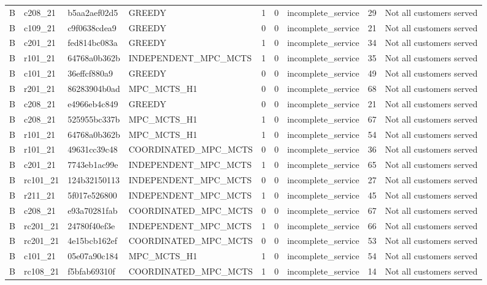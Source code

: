 \begin{table}
{\begin{tabular}{llllrrlrl}
B & c208\_21 & b5aa2aef02d5 & GREEDY & 1 & 0 & incomplete\_service & 29 & Not all customers served \\
B & c109\_21 & c9f0638cdea9 & GREEDY & 0 & 0 & incomplete\_service & 21 & Not all customers served \\
B & c201\_21 & fed814bc083a & GREEDY & 1 & 0 & incomplete\_service & 34 & Not all customers served \\
B & r101\_21 & 64768a0b362b & INDEPENDENT\_MPC\_MCTS & 1 & 0 & incomplete\_service & 35 & Not all customers served \\
B & c101\_21 & 36effcf880a9 & GREEDY & 0 & 0 & incomplete\_service & 49 & Not all customers served \\
B & r201\_21 & 86283904b0ad & MPC\_MCTS\_H1 & 0 & 0 & incomplete\_service & 68 & Not all customers served \\
B & c208\_21 & e4966eb4c849 & GREEDY & 0 & 0 & incomplete\_service & 21 & Not all customers served \\
B & c208\_21 & 525955bc337b & MPC\_MCTS\_H1 & 1 & 0 & incomplete\_service & 67 & Not all customers served \\
B & r101\_21 & 64768a0b362b & MPC\_MCTS\_H1 & 1 & 0 & incomplete\_service & 54 & Not all customers served \\
B & r101\_21 & 49631cc39c48 & COORDINATED\_MPC\_MCTS & 0 & 0 & incomplete\_service & 36 & Not all customers served \\
B & c201\_21 & 7743eb1ac99e & INDEPENDENT\_MPC\_MCTS & 1 & 0 & incomplete\_service & 65 & Not all customers served \\
B & rc101\_21 & 124b32150113 & INDEPENDENT\_MPC\_MCTS & 0 & 0 & incomplete\_service & 27 & Not all customers served \\
B & r211\_21 & 5f017e526800 & INDEPENDENT\_MPC\_MCTS & 1 & 0 & incomplete\_service & 45 & Not all customers served \\
B & c208\_21 & e93a70281fab & COORDINATED\_MPC\_MCTS & 0 & 0 & incomplete\_service & 67 & Not all customers served \\
B & rc201\_21 & 24780f40ef3e & INDEPENDENT\_MPC\_MCTS & 1 & 0 & incomplete\_service & 66 & Not all customers served \\
B & rc201\_21 & 4e15bcb162ef & COORDINATED\_MPC\_MCTS & 0 & 0 & incomplete\_service & 53 & Not all customers served \\
B & c101\_21 & 05e07a90c184 & MPC\_MCTS\_H1 & 1 & 0 & incomplete\_service & 54 & Not all customers served \\
B & rc108\_21 & f5bfab69310f & COORDINATED\_MPC\_MCTS & 1 & 0 & incomplete\_service & 14 & Not all customers served \\

\end{tabular}}
\end{table}
